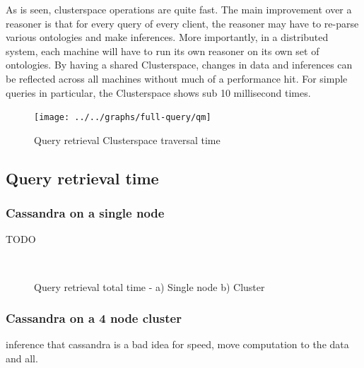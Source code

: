 \documentclass[conference]{IEEEtran}
\begin{document}
As is seen, clusterspace operations are quite fast. The main improvement over a reasoner is that for every query of every client, the reasoner may have to re-parse various ontologies and make inferences. More importantly, in a distributed system, each machine will have to run its own reasoner on its own set of ontologies. By having a shared Clusterspace, changes in data and inferences can be reflected across all machines without much of a performance hit. For simple queries in particular, the Clusterspace shows sub 10 millisecond times.

\begin{figure}[h]
    \centering
    \texttt{[image: ../../graphs/full-query/qm]}
    \caption{Query retrieval Clusterspace traversal time}
    \label{fig:eval:qcs}
\end{figure}

\subsection{Query retrieval time}

\subsubsection{Cassandra on a single node}

TODO

\begin{figure}[t]
    \centering
    \mbox{
        \quad
    }
    \caption{Query retrieval total time - a) Single node b) Cluster }
    \label{fig:eval:qtotal}
\end{figure}

\subsubsection{Cassandra on a 4 node cluster}

inference that cassandra is a bad idea for speed, move computation to the data and all.
\end{document}
